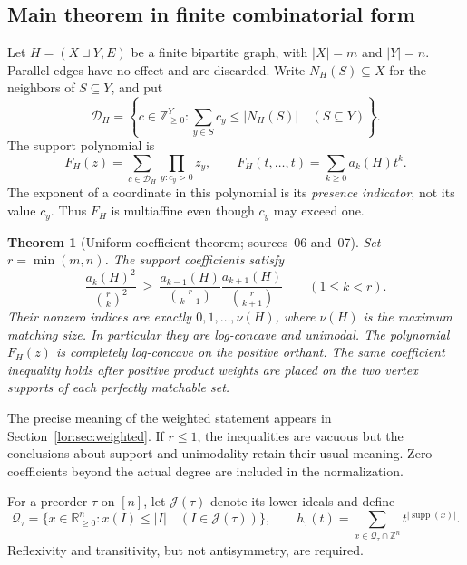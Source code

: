 \documentclass[11pt]{article}
\numberwithin{equation}{section}
\newtheorem{theorem}{Theorem}[section]
\theoremstyle{definition}
\newcommand{\R}{\mathbb R}
\newcommand{\Z}{\mathbb Z}
\newcommand{\J}{\mathcal J(\tau)}
\newcommand{\Qt}{\mathcal Q_\tau}
\newcommand{\supp}{\operatorname{supp}}
\newcommand{\cD}{\mathcal D}
\begin{document}
\subsection{Main theorem in finite combinatorial form}
Let $H=(X\sqcup Y,E)$ be a finite bipartite graph, with $|X|=m$ and $|Y|=n$.
Parallel edges have no effect and are discarded. Write $N_H(S)\subseteq X$
for the neighbors of $S\subseteq Y$, and put
\begin{equation}
 \cD_H=\left\{c\in\Z_{\ge0}^{Y}:
        \sum_{y\in S}c_y\le |N_H(S)|\quad(S\subseteq Y)\right\}.
 \label{lor:eq:demand}
\end{equation}
The support polynomial is
\begin{equation}
 F_H(z)=\sum_{c\in\cD_H}\prod_{y:c_y>0}z_y,
 \qquad F_H(t,\ldots,t)=\sum_{k\ge0}a_k(H)t^k.
 \label{lor:eq:F}
\end{equation}
The exponent of a coordinate in this polynomial is its \emph{presence
indicator}, not its value $c_y$. Thus $F_H$ is multiaffine even though
$c_y$ may exceed one.

\begin{theorem}[Uniform coefficient theorem; sources~06 and~07]\label{lor:thm:main}
Set $r=\min(m,n)$. The support coefficients satisfy
\begin{equation}
 \frac{a_k(H)^2}{\binom r k^2}
 \ \ge\
 \frac{a_{k-1}(H)}{\binom r{k-1}}
 \frac{a_{k+1}(H)}{\binom r{k+1}}
 \qquad(1\le k<r).
 \label{lor:eq:mainULC}
\end{equation}
Their nonzero indices are exactly $0,1,\ldots,\nu(H)$, where $\nu(H)$ is
the maximum matching size. In particular they are log-concave and unimodal.
The polynomial $F_H(z)$ is completely log-concave on the positive orthant.
The same coefficient inequality holds after positive product weights are
placed on the two vertex supports of each perfectly matchable set.
\end{theorem}
The precise meaning of the weighted statement appears in
Section~\ref{lor:sec:weighted}. If $r\le1$, the inequalities are vacuous but the
conclusions about support and unimodality retain their usual meaning. Zero
coefficients beyond the actual degree are included in the normalization.

For a preorder $\tau$ on $[n]$, let $\J$ denote its lower
ideals and define
\begin{equation}
 \Qt=\{x\in\R_{\ge0}^{n}:x(I)\le |I|\quad(I\in\J)\},
 \qquad h_\tau(t)=\sum_{x\in \Qt\cap\Z^n}t^{|\supp(x)|}.
 \label{lor:eq:preorderQ}
\end{equation}
Reflexivity and transitivity, but not antisymmetry, are required.
\end{document}
